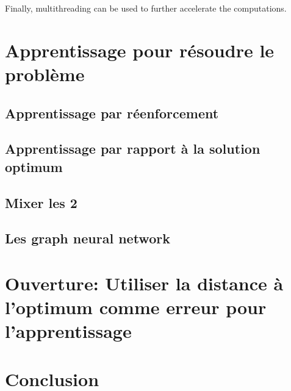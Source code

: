 \documentclass[letterpaper]{article}
\begin{document}
\begin{multicols}{2}
Finally, multithreading can be used to further accelerate the computations.

\section{Apprentissage pour résoudre le problème}

\subsection{Apprentissage par réenforcement}

\subsection{Apprentissage par rapport à la solution optimum}

\subsection{Mixer les 2}

\subsection{Les graph neural network}

\section{Ouverture: Utiliser la distance à l'optimum comme erreur pour l'apprentissage}

\section{Conclusion}

\end{multicols}
\end{document}
